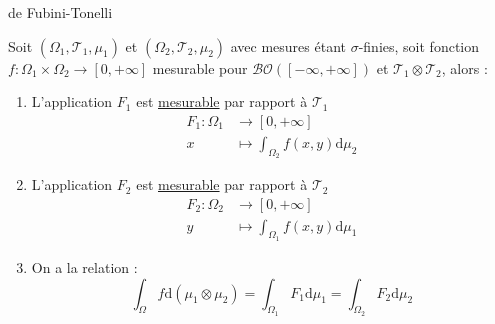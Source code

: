 \begin{Theorem}{de Fubini-Tonelli}{}

Soit $(\Omega_1, \mathcal{T}_1, \mu_1)$ et $(\Omega_2, \mathcal{T}_2, \mu_2)$ avec mesures étant $\sigma$-finies, soit fonction $f : \Omega_1 \times \Omega_2 \to [0, +\infty]$ mesurable pour $\mathcal{BO}([- \infty, +\infty])$ et $\mathcal{T}_1 \otimes \mathcal{T}_2$, alors : 
\begin{enumerate}

    \item L'application $F_1$ est \underline{mesurable} par rapport à $\mathcal{T}_1$ \begin{align}
        F_1 : \Omega_1 &\to [0, + \infty] \\ 
        x &\mapsto \int_{\Omega_2}^{} f(x, y) \mathrm{d}\mu_2
      \end{align}

    \item L'application $F_2$ est \underline{mesurable} par rapport à $\mathcal{T}_2$
      \begin{align}
        F_2 : \Omega_2 &\to [0, + \infty] \\ 
        y &\mapsto \int_{\Omega_1}^{} f(x, y) \mathrm{d}\mu_1
      \end{align}

    \item On a la relation : 
      \begin{equation}
        \int_{\Omega}^{} f \mathrm{d}(\mu_1 \otimes \mu_2) = \int_{\Omega_1}^{} F_1 \mathrm{d}\mu_1 = \int_{\Omega_2}^{} F_2 \mathrm{d}\mu_2
      \end{equation}

\end{enumerate}



\end{Theorem}

